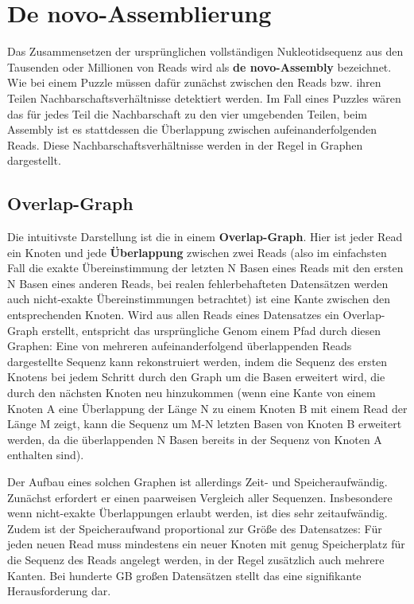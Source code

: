 \section{De novo-Assemblierung}

Das Zusammensetzen der ursprünglichen vollständigen Nukleotidsequenz aus den Tausenden oder Millionen von Reads wird als \textbf{de novo-Assembly} bezeichnet. Wie bei einem Puzzle müssen dafür zunächst zwischen den Reads bzw. ihren Teilen Nachbarschaftsverhältnisse detektiert werden. Im Fall eines Puzzles wären das für jedes Teil die Nachbarschaft zu den vier umgebenden Teilen, beim Assembly ist es stattdessen die Überlappung zwischen aufeinanderfolgenden Reads. Diese Nachbarschaftsverhältnisse werden in der Regel in Graphen dargestellt. 

\subsection{Overlap-Graph}

Die intuitivste Darstellung ist die in einem \textbf{Overlap-Graph}. Hier ist jeder Read ein Knoten und jede \textbf{Überlappung} zwischen zwei Reads (also im einfachsten Fall die exakte Übereinstimmung der letzten N Basen eines Reads mit den ersten N Basen eines anderen Reads, bei realen fehlerbehafteten Datensätzen werden auch nicht-exakte Übereinstimmungen betrachtet) ist eine Kante zwischen den entsprechenden Knoten. Wird aus allen Reads eines Datensatzes ein Overlap-Graph erstellt, entspricht das ursprüngliche Genom einem Pfad durch diesen Graphen: Eine von mehreren aufeinanderfolgend überlappenden Reads dargestellte Sequenz kann rekonstruiert werden, indem die Sequenz des ersten Knotens bei jedem Schritt durch den Graph um die Basen erweitert wird, die durch den nächsten Knoten neu hinzukommen (wenn eine Kante von einem Knoten A eine Überlappung der Länge N zu einem Knoten B mit einem Read der Länge M zeigt, kann die Sequenz um M-N letzten Basen von Knoten B erweitert werden, da die überlappenden N Basen bereits in der Sequenz von Knoten A enthalten sind). 

Der Aufbau eines solchen Graphen ist allerdings Zeit- und Speicheraufwändig. Zunächst erfordert er einen paarweisen Vergleich aller Sequenzen. Insbesondere wenn nicht-exakte Überlappungen erlaubt werden, ist dies sehr zeitaufwändig. Zudem ist der Speicheraufwand proportional zur Größe des Datensatzes: Für jeden neuen Read muss mindestens ein neuer Knoten mit genug Speicherplatz für die Sequenz des Reads angelegt werden, in der Regel zusätzlich auch mehrere Kanten. Bei hunderte GB großen Datensätzen stellt das eine signifikante Herausforderung dar. 

